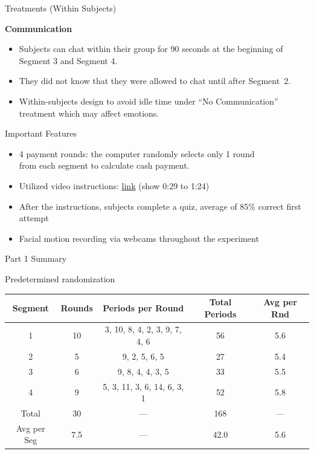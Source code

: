 \documentclass{beamer}
\begin{document}
\begin{frame}{Treatments (Within Subjects)}

\textbf{Communication}

\begin{itemize}
    \item  Subjects can chat within their group for 90 seconds at the beginning of Segment 3 and Segment 4.
    \item They did not know that they were allowed to chat until after Segment~2.
    \item Within-subjects design to avoid idle time under ``No Communication'' treatment which may affect emotions.
\end{itemize}

\end{frame}


\begin{frame}{Important Features}

\begin{itemize}
    \item 4 payment rounds: the computer randomly selects only 1 round \\from each segment to calculate cash payment.
    \item Utilized video instructions: \href{https://youtu.be/5h83uTS_RMc}{link} (show 0:29 to 1:24) 
    \item After the instructions, subjects complete a quiz, average of 85\% correct first attempt
    \item Facial motion recording via webcams throughout the experiment
\end{itemize}
\end{frame}


\begin{frame}{Part 1 Summary}
\begin{center}
\begin{minipage}{10cm}

\end{minipage}
\end{center}
\end{frame}


\begin{frame}{Predetermined randomization}

\begin{table}[]\footnotesize
    \centering
\begin{tabular}{ccccc}
\toprule
Segment &Rounds & Periods per Round & Total Periods & Avg per Rnd \\
\midrule
  1  & 10 & 3, 10, 8, 4, 2, 3, 9, 7, 4, 6 & 56 & 5.6 \\
  2 & 5 & 9, 2, 5, 6, 5 & 27 & 5.4 \\
  3 & 6 & 9, 8, 4, 4, 3, 5 & 33 & 5.5 \\
  4 & 9 & 5, 3, 11, 3, 6, 14, 6, 3, 1 & 52 & 5.8 \\
\midrule
 \multicolumn{1}{c}{Total}  & 30 & --- & 168 & --- \\
 \multicolumn{1}{c}{ Avg per Seg} & 7.5 & --- & 42.0 & 5.6 \\
\bottomrule
\end{tabular}

\end{table}
\end{frame}
\end{document}
